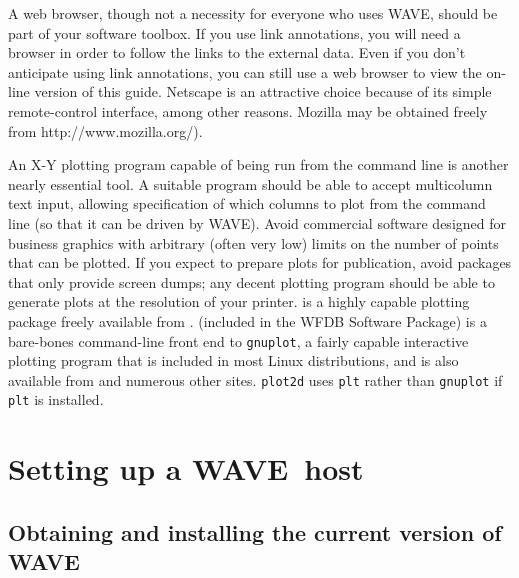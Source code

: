 \documentclass[twoside]{book}
\newcommand{\WAVE}{{\sf WAVE}\xspace}
\begin{document}
A web browser, though not a necessity for everyone who uses \WAVE{},
should be part of your software toolbox.  If you use link annotations,
you will need a browser in order to follow the links to the external
data.  Even if you don't anticipate using link annotations, you can
still use a web browser to view the on-line version of this guide.
Netscape is an attractive choice because of its simple remote-control
interface, among other reasons.  Mozilla may be obtained freely from
{http://www.mozilla.org/}).

An X-Y plotting program capable of being run from the command line is another
nearly essential tool.  A suitable program should be able to accept multicolumn
text input, allowing specification of which columns to plot from the
command line (so that it can be driven by \WAVE{}).  Avoid commercial software
designed for business graphics with arbitrary (often very low) limits
on the number of points that can be plotted.  If you expect to prepare
plots for publication, avoid packages that only provide screen dumps;
any decent plotting program should be able to generate plots
at the resolution of your printer.  
 is a highly capable
plotting package freely available from
.
(included in the WFDB Software Package) is a
bare-bones command-line front end to {\tt gnuplot}, a fairly capable
interactive plotting program that is included in most Linux distributions,
and is also available from
 and
numerous other sites.
{\tt plot2d} uses {\tt plt} rather than {\tt gnuplot} if {\tt plt} is
installed.

\chapter{Setting up a \WAVE{}~host}

\label{app:setup}
\section{Obtaining and installing the current version of \WAVE{}}
\end{document}
